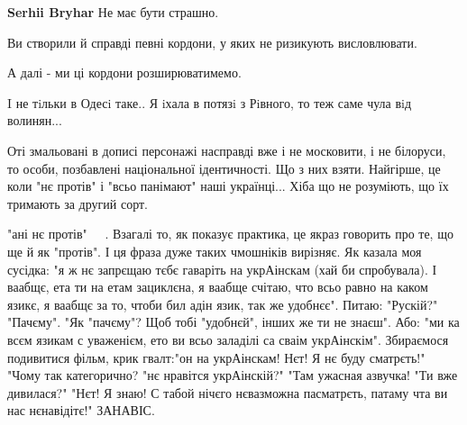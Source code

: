 \begin{itemize}
\begin{itemize}
 
\textbf{Serhii Bryhar}
Не має бути страшно.

Ви створили й справді певні кордони, у яких не ризикують висловлювати.

А далі - ми ці кордони розширюватимемо.

\end{itemize}

 
I не тiльки в Одесi таке.. Я iхала в потязi з Рiвного, то теж саме чула вiд волинян...

 

Оті змальовані в дописі персонажі насправді вже і не московити, і не білоруси,
то особи, позбавлені національної ідентичності. Що з них взяти. Найгірше, це
коли "нє протів" і "всьо панімают" наші українці... Хіба що не розуміють, що їх
тримають за другий сорт.

 

"ані нє протів"🤮🤮🤮🤮🤮. Взагалі то, як показує практика, це якраз говорить
про те, що ще й як "протів". І ця фраза дуже таких чмошніків вирізняє. Як
казала моя сусідка: "я ж нє запрєщаю тєбє гаваріть на укрАінскам (хай би
спробувала). І ваабщє, ета ти на етам зациклєна, я ваабще счітаю, что всьо
равно на каком язикє, я ваабщє за то, чтоби бил адін язик, так же удобнєє".
Питаю: "Рускій?" "Пачєму". "Як "пачєму"? Щоб тобі "удобнєй", інших же ти не
знаєш". Або: "ми ка всєм язикам с уваженієм, ето ви всьо заладілі са сваім
укрАінскім". Збираємося подивитися фільм, крик гвалт:"он на укрАінскам! Нєт! Я
нє буду сматрєть!" "Чому так категорично? "нє нравітся укрАінскій?" "Там
ужасная азвучка! "Ти вже дивилася?" "Нєт! Я знаю! С табой нічєго нєвазможна
пасматрєть, патаму чта ви нас нєнавідітє!" ЗАНАВІС. \Smiley[1.0][yellow]


\end{itemize}
